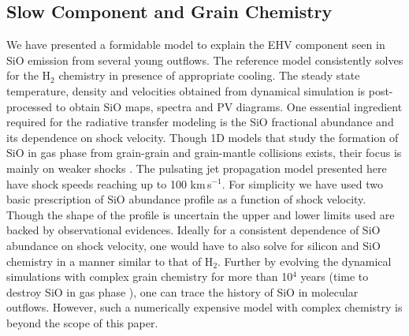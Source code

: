 \documentclass[useAMS,usenatbib,letters]{mn2e}
\begin{document}
\subsection{Slow Component and Grain Chemistry}
%
We have presented a formidable model to explain the EHV component seen
in SiO emission from several young outflows. The reference model
consistently solves for the H$_{2}$ chemistry in presence of
appropriate cooling. The steady state temperature, density and velocities obtained from dynamical
simulation is post-processed to obtain SiO maps, spectra and PV
diagrams. One essential ingredient required for the radiative transfer modeling
is the SiO fractional abundance and its dependence on shock velocity. 
Though 1D models that study the formation of SiO in gas phase from grain-grain and grain-mantle
collisions exists, their focus is mainly on weaker shocks
\cite{Schilke:1997p14140, Caselli:1997p14853, Gusdorf:2008p13800}. 
The pulsating jet propagation model presented here have shock speeds
reaching up to 100 km\,s$^{-1}$. For simplicity we have used two basic
prescription of SiO abundance profile as a function of shock
velocity. Though the shape of the profile is uncertain the upper and
lower limits used are backed by observational evidences. Ideally for a consistent
dependence of SiO abundance on shock velocity, one would have to also
solve for silicon and SiO chemistry in a manner similar to that of
H$_{2}$. Further by evolving the dynamical simulations with complex
grain chemistry for more than 10$^{4}$ years (time to destroy SiO in
gas phase \cite{Codella:1999p12584}),  one can trace the history of 
SiO in molecular outflows. However, such a numerically expensive model 
with complex chemistry is beyond the scope of this paper.  
%
\end{document}
